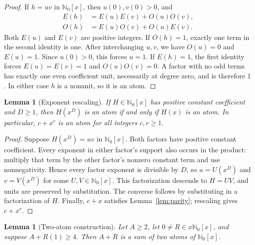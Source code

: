 \documentclass[11pt]{amsart}
\newcommand{\Nzero}{\mathbb N_0}
\newtheorem{lemma}[theorem]{Lemma}
\theoremstyle{definition}
\theoremstyle{remark}
\begin{document}
\begin{proof}
If $h=uv$ in $\Nzero[x]$, then $u(0),v(0)>0$, and
\begin{align*}
E(h)&=E(u)E(v)+O(u)O(v),\\
O(h)&=E(u)O(v)+O(u)E(v).
\end{align*}
Both $E(u)$ and $E(v)$ are positive integers. If $O(h)=1$, exactly one
term in the second identity is one. After interchanging $u,v$, we have
$O(u)=0$ and $E(u)=1$. Since $u(0)>0$, this forces $u=1$.
If $E(h)=1$, the first identity forces $E(u)=E(v)=1$ and
$O(u)O(v)=0$. A factor with no odd terms has exactly one even coefficient
unit, necessarily at degree zero, and is therefore $1$.
In either case $h$ is a nonunit, so it is an atom.
\end{proof}

\begin{lemma}[Exponent rescaling]\label{lem:rescale}
If $H\in\Nzero[x]$ has positive constant coefficient and $D\ge1$, then
$H(x^D)$ is an atom if and only if $H(x)$ is an atom. In particular,
$c+x^r$ is an atom for all integers $c,r\ge1$.
\end{lemma}

\begin{proof}
Suppose $H(x^D)=uv$ in $\Nzero[x]$. Both factors have positive constant
coefficient. Every exponent in either factor's support also occurs in
the product: multiply that term by the other factor's nonzero constant
term and use nonnegativity. Hence every factor exponent is divisible by
$D$, so $u=U(x^D)$ and $v=V(x^D)$ for some $U,V\in\Nzero[x]$.
This factorization descends to $H=UV$, and units are preserved by
substitution. The converse follows by substituting in a factorization of
$H$. Finally, $c+x$ satisfies Lemma~\ref{lem:parity}; rescaling gives
$c+x^r$.
\end{proof}

\begin{lemma}[Two-atom construction]\label{lem:two}
Let $A\ge2$, let $0\ne R\in x\Nzero[x]$, and suppose $A+R(1)\ge4$.
Then $A+R$ is a sum of two atoms of $\Nzero[x]$.
\end{lemma}
\end{document}
